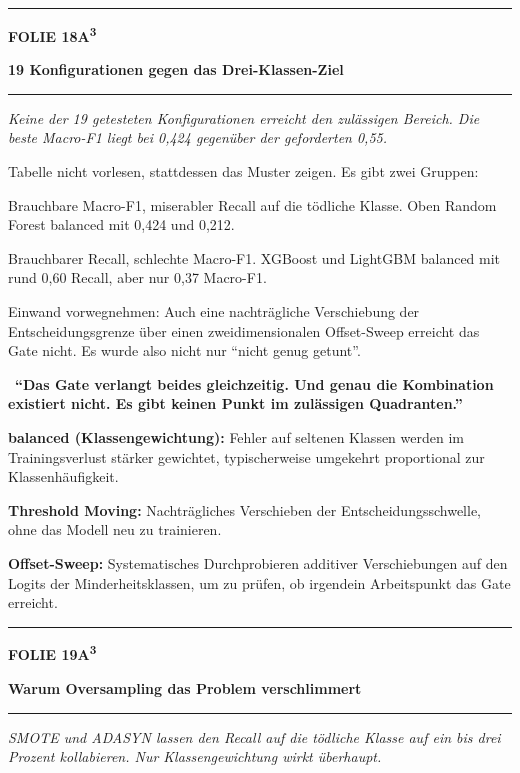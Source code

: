 \documentclass[9pt]{extarticle}
\newcommand{\karte}[3]{%
  \clearpage
  {\color{Accent}\rule{\linewidth}{2.4pt}}\par\vspace{2.5pt}
  {\fontsize{8}{9}\selectfont\bfseries\color{Accent}%
   FOLIE #1\hspace{1.2em}\textbar\hspace{1.2em}#2}\par\vspace{1pt}
  {\fontsize{16}{18}\selectfont\bfseries\color{AccentDark}#3}\par\vspace{3pt}
  {\color{Accent!45}\rule{\linewidth}{0.5pt}}\par\vspace{4pt}%
}
\newcommand{\rubrik}[1]{%
  \vspace{3.5pt}{\fontsize{7.5}{8.5}\selectfont\bfseries\color{Grau}%
  \MakeUppercase{#1}}\par\vspace{1.5pt}}
\newcommand{\kernsatz}[1]{%
  \begin{tcolorbox}[enhanced,sharp corners,boxrule=0pt,
    leftrule=2.2pt,colframe=Accent,colback=AccentPale,
    left=5pt,right=5pt,top=3.5pt,bottom=3.5pt,before skip=1pt,after skip=2pt]
    \color{AccentDark}\itshape #1
  \end{tcolorbox}}
\newcommand{\merksatz}[1]{%
  \vspace{2pt}{\color{KSI}$\blacktriangleright$}\ \textbf{\color{KSI}#1}\par}
\newcommand{\bg}[2]{\item \textbf{#1:} #2}
\begin{document}
\karte{18}{A\textsuperscript{3}}{19 Konfigurationen gegen das Drei-Klassen-Ziel}

\kernsatz{Keine der 19 getesteten Konfigurationen erreicht den zulässigen Bereich. Die beste
Macro-F1 liegt bei 0,424 gegenüber der geforderten 0,55.}

\rubrik{Sagen}
\begin{sag}
  \item Tabelle nicht vorlesen, stattdessen das Muster zeigen. Es gibt zwei Gruppen:
  \begin{sag}
    \item Brauchbare Macro-F1, miserabler Recall auf die tödliche Klasse. Oben Random Forest
          balanced mit 0,424 und 0,212.
    \item Brauchbarer Recall, schlechte Macro-F1. XGBoost und LightGBM balanced mit rund 0,60
          Recall, aber nur 0,37 Macro-F1.
  \end{sag}
  \item Einwand vorwegnehmen: Auch eine nachträgliche Verschiebung der Entscheidungsgrenze über
        einen zweidimensionalen Offset-Sweep erreicht das Gate nicht. Es wurde also nicht nur
        \enquote{nicht genug getunt}.
\end{sag}

\merksatz{\enquote{Das Gate verlangt beides gleichzeitig. Und genau die Kombination existiert
nicht. Es gibt keinen Punkt im zulässigen Quadranten.}}

\rubrik{Begriffe}
\begin{begriff}
  \bg{balanced (Klassengewichtung)}{Fehler auf seltenen Klassen werden im Trainingsverlust
      stärker gewichtet, typischerweise umgekehrt proportional zur Klassenhäufigkeit.}
  \bg{Threshold Moving}{Nachträgliches Verschieben der Entscheidungsschwelle, ohne das Modell
      neu zu trainieren.}
  \bg{Offset-Sweep}{Systematisches Durchprobieren additiver Verschiebungen auf den Logits der
      Minderheitsklassen, um zu prüfen, ob irgendein Arbeitspunkt das Gate erreicht.}
\end{begriff}

\karte{19}{A\textsuperscript{3}}{Warum Oversampling das Problem verschlimmert}

\kernsatz{SMOTE und ADASYN lassen den Recall auf die tödliche Klasse auf ein bis drei Prozent
kollabieren. Nur Klassengewichtung wirkt überhaupt.}
\end{document}
